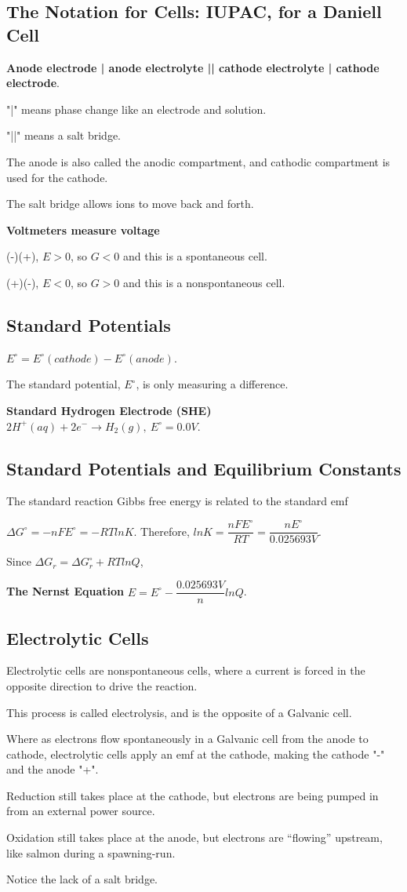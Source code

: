 \documentclass[a4paper,12pt]{article}
\begin{document}
\subsection{The Notation for Cells: IUPAC, for a Daniell Cell}
\textbf{Anode electrode | anode electrolyte || cathode electrolyte | cathode electrode}.\par
"|" means phase change like an electrode and solution.\par
"||" means a salt bridge.\par
The anode is also called the anodic compartment, and cathodic compartment is used for the cathode.\par
The salt bridge allows ions to move back and forth.\par
\textbf{Voltmeters measure voltage}\par
(-)(+), $E > 0$, so $G < 0$ and this is a spontaneous cell.\par
(+)(-), $E < 0$, so $G > 0$ and this is a nonspontaneous cell.
\subsection{Standard Potentials}
$E^{\circ} = E^{\circ}(cathode) - E^{\circ}(anode)$.\par
The standard potential, $E^{\circ}$, is only measuring a difference.\par
\textbf{Standard Hydrogen Electrode (SHE)} $2 H^{+} (aq) + 2 e^{-}\rightarrow H_{2}(g), \ E^{\circ} = 0.0 V$.
\subsection{Standard Potentials and Equilibrium Constants}
The standard reaction Gibbs free energy is related to the standard emf\par
$\Delta G^{\circ} = -nFE^{\circ}=-RTlnK$. Therefore, $lnK =\dfrac{nFE^{\circ}}{RT}=\dfrac{nE^{\circ}}{0.025693V}$.\par
Since $\Delta G_{r} = \Delta G^{\circ}_{r} + RT lnQ$,\par
\textbf{The Nernst Equation} $E =E^{\circ} -\dfrac{0.025693V}{n}lnQ$.
\subsection{Electrolytic Cells}
Electrolytic cells are nonspontaneous cells, where a current is forced in the opposite direction to drive the reaction.\par
This process is called electrolysis, and is the opposite of a Galvanic cell.\par
Where as electrons flow spontaneously in a Galvanic cell from the anode to cathode, electrolytic cells apply an emf at the cathode, making the cathode "-" and the anode "+".\par
Reduction still takes place at the cathode, but electrons are being pumped in from an external power source.\par
Oxidation still takes place at the anode, but electrons are “flowing” upstream, like salmon during a spawning-run.\par
Notice the lack of a salt bridge.\par
\end{document}
